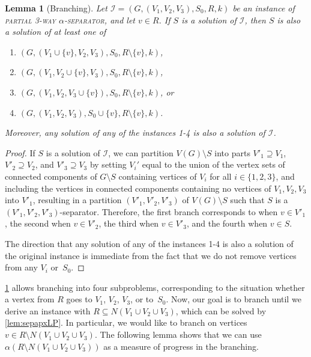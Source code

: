 \documentclass[11pt]{article}
\newtheorem{lemma}{Lemma}[section]
\theoremstyle{definition}
\begin{document}
\begin{lemma}[Branching]
\label{obs:branch}
Let $\mathcal{I} = (G, (V_1, V_2, V_3), S_0, R, k)$ be an instance of \textsc{partial 3-way $\alpha$-separator}, and let $v \in R$.
If $S$ is a solution of $\mathcal{I}$, then $S$ is also a solution of at least one of
\begin{enumerate}
\item $(G, (V_1 \cup \{v\}, V_2, V_3), S_0, R \setminus \{v\}, k)$,
\item $(G, (V_1, V_2 \cup \{v\}, V_3), S_0, R \setminus \{v\}, k)$,
\item $(G, (V_1, V_2, V_3 \cup \{v\}), S_0, R \setminus \{v\}, k)$, or
\item $(G, (V_1, V_2, V_3), S_0 \cup \{v\}, R \setminus \{v\}, k)$.
\end{enumerate}
Moreover, any solution of any of the instances 1-4 is also a solution of $\mathcal{I}$.
\end{lemma}

\begin{proof}
If $S$ is a solution of $\mathcal{I}$, we can partition $V(G) \setminus S$ into parts $V'_1 \supseteq V_1$, $V'_2 \supseteq V_2$, and $V'_3 \supseteq V_3$ by setting $V_i'$ equal to the union of the vertex sets of connected components of $G \setminus S$ containing vertices of $V_i$
for all $i\in\{1,2,3\}$, and including the vertices in connected components containing no vertices of $V_1, V_2, V_3$ into $V'_1$, resulting in a partition $(V'_1, V'_2, V'_3)$ of $V(G) \setminus S$ such that $S$ is a $(V'_1, V'_2, V'_3)$-separator.
Therefore, the first branch corresponds to when $v \in V'_1$, the second when $v \in V'_2$, the third when $v \in V'_3$, and the fourth when $v \in S$.

The direction that any solution of any of the instances 1-4 is also a solution of the original instance is immediate from the fact that we do not remove vertices from any $V_i$ or~$S_0$.
\end{proof}

\cref{obs:branch} allows branching into four subproblems, corresponding to the situation whether a vertex from  $R$ goes to $V_1$, $V_2$, $V_3$, or to~$S_0$.
Now, our goal is to branch until we derive an instance with $R \subseteq N(V_1 \cup V_2 \cup V_3)$, which can be solved by \cref{lem:sepapxLP}.
In particular, we would like to branch on vertices $v \in R \setminus N(V_1 \cup V_2 \cup V_3)$.
The following lemma shows that we can use $\alpha(R \setminus N(V_1 \cup V_2 \cup V_3))$ as a measure of progress in the branching.
\end{document}

